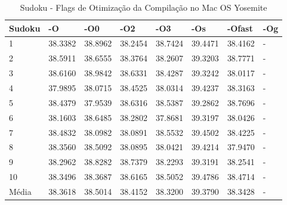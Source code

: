 \begin{table}[!ht]
\centering
\caption{Sudoku - Flags de Otimização da Compilação no Mac OS Yosemite}
\label{tab:otimizacao_compilacao:mac:sudoku}
\begin{tabular}{llllllll}
\textbf{Sudoku}         & \textbf{-O}  & \textbf{-O0}   & \textbf{-O2} & \textbf{-O3} & \textbf{-Os} & \textbf{-Ofast} & \textbf{-Og} \\ \toprule
1                       & 38.3382      & 38.8962        & 38.2454      & 38.7424      & 39.4471      & 38.4162         &  -           \\ 
2                       & 38.5911      & 38.6555        & 38.3764      & 38.2607      & 39.3203      & 38.7771         &  -           \\ 
3                       & 38.6160      & 38.9842        & 38.6331      & 38.4287      & 39.3242      & 38.0117         &  -           \\ 
4                       & 37.9895      & 38.0715        & 38.4525      & 38.0314      & 39.4237      & 38.3163         &  -           \\ 
5                       & 38.4379      & 37.9539        & 38.6316      & 38.5387      & 39.2862      & 38.7696         &  -           \\ 
6                       & 38.1603      & 38.6485        & 38.2802      & 37.8681      & 39.3197      & 38.0426         &  -           \\ 
7                       & 38.4832      & 38.0982        & 38.0891      & 38.5532      & 39.4502      & 38.4225         &  -           \\ 
8                       & 38.3560      & 38.5092        & 38.0895      & 38.0421      & 39.4214      & 37.9470         &  -           \\ 
9                       & 38.2962      & 38.8282        & 38.7379      & 38.2293      & 39.3191      & 38.2541         &  -           \\ 
10                      & 38.3496      & 38.3687        & 38.6165      & 38.5052      & 39.4786      & 38.4714         &  -           \\ \bottomrule
Média                   & 38.3618      & 38.5014        & 38.4152      & 38.3200      & 39.3790      & 38.3428         &  -           \\ 
\end{tabular}
\end{table}

